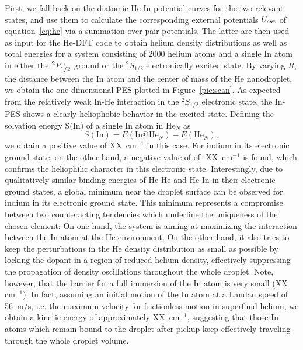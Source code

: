 \documentclass[twoside,twocolumn,9pt]{article}
\begin{document}
First, we fall back on the diatomic He-In potential curves for the two relevant states, and use them to calculate the corresponding external potentials $U_{\rm ext}$ of equation~\ref{eq:he} via a summation over pair potentials. The latter are then used as input for the He-DFT code to obtain helium density distributions as well as total energies for a system consisting of 2000 helium atoms and a single In atom in either the $^2P^{\rm o}_{1/2}$ ground or the $^2S_{1/2}$ electronically excited state. By varying $R$, the distance between the In atom and the center of mass of the He nanodroplet, we obtain the one-dimensional PES plotted in Figure~\ref{pic:scan}. As expected from the relatively weak In-He interaction in the $^2S_{1/2}$ electronic state, the In- PES shows a clearly heliophobic behavior in the excited state. Defining the solvation energy S(In) of a single In atom in He$_N$ as
\begin{equation}
  \label{eq:solv}
S(\mathrm{In}) = E(\mathrm{In@He}_{N}) - E(\mathrm{He}_{N}),
\end{equation}
we obtain a positive value of XX~cm$^{-1}$ in this case. For indium in its electronic ground state, on the other hand, a negative value of of -XX~cm$^{-1}$ is found, which confirms the heliophilic character in this electronic state. Interestingly, due to qualitatively similar binding energies of He-He and He-In in their electronic ground states, a global minimum near the droplet surface can be observed  for indium in its electronic ground state. This minimum represents a compromise between two counteracting tendencies which underline the uniqueness of the chosen element: On one hand, the system is aiming at maximizing the interaction between the In atom at the He environment. On the other hand, it also tries to keep the perturbations in the He density distribution as small as possible by locking the dopant in a region of reduced helium density, effectively suppressing the propagation of density oscillations throughout the whole droplet. Note, however, that the barrier for a full immersion of the In atom is very small (XX cm$^{-1}$). In fact, assuming an initial motion of the In atom at a Landau speed of 56~m/s, i.e. the maximum velocity for frictionless motion in superfluid helium,  we obtain a kinetic energy of approximately XX~cm$^{-1}$, suggesting that those In atoms which remain bound to the droplet after pickup keep effectively traveling through the whole droplet volume.\cite{}

\end{document}
